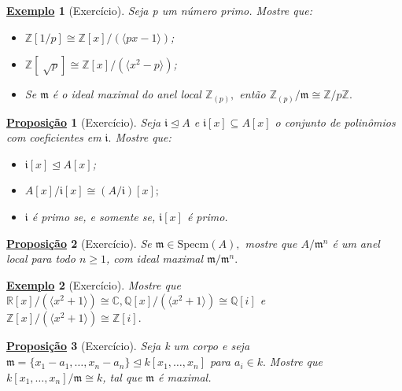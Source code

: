 \documentclass{article}
\newtheorem*{prop*}{\underline{Proposi\c c\~ao}}
\newtheorem{example}{\underline{Exemplo}}
\begin{document}
\begin{example}[Exercício]
  Seja p um número primo. Mostre que:
  \begin{itemize}
    \item[1)] \(\mathbb{Z}[1/p]\cong \mathbb{Z}[x]/(\langle px-1 \rangle)\);
    \item[2)] \(\mathbb{Z}[\sqrt[]{p}]\cong \mathbb{Z}[x]/(\langle x^{2}-p \rangle)\);
    \item[3)] Se \(\mathfrak{m}\) é o ideal maximal do anel local \(\mathbb{Z}_{(p)},\) então \(\mathbb{Z}_{(p)}/\mathfrak{m}\cong{\mathbb{Z}/p \mathbb{Z}}.\)
  \end{itemize}
\end{example}
\begin{prop*}[Exercício]
  Seja \(\mathfrak{i}\trianglelefteq{A}\) e \(\mathfrak{i}[x]\subseteq A[x]\) o conjunto de polinômios 
  com coeficientes em \(\mathfrak{i}.\) Mostre que:
  \begin{itemize}
    \item[1)] \(\mathfrak{i}[x] \trianglelefteq{A[x]}\);
    \item[2)] \(A[x]/\mathfrak{i}[x]\cong{(A/\mathfrak{i})}[x];\)
    \item[3)] \(\mathfrak{i}\) é primo se, e somente se, \(\mathfrak{i}[x]\) é primo.
  \end{itemize}
\end{prop*}
\begin{prop*}[Exercício]
  Se \(\mathfrak{m}\in \mathrm{Specm}(A),\) mostre que \(A/\mathfrak{m}^{n}\) é um anel local para todo
  \(n \geq 1\), com ideal maximal \(\mathfrak{m}/\mathfrak{m}^{n}.\)
\end{prop*}
\begin{example}[Exercício]
  Mostre que \(\mathbb{R}[x]/(\langle x^{2}+1 \rangle)\cong{\mathbb{C}}, \mathbb{Q}[x]/(\langle x^{2}+1 \rangle)\cong{\mathbb{Q}[i]}\)
  e \(\mathbb{Z}[x]/(\langle x^{2}+1 \rangle)\cong{\mathbb{Z}[i]}.\)
\end{example}
\begin{prop*}[Exercício]
  Seja k um corpo e seja \(\mathfrak{m} = \{x_{1}-a_{1}, \dotsc, x_{n}-a_{n}\}\trianglelefteq{k[x_{1}, \dotsc, x_{n}]}\) para
  \(a_{i}\in k.\) Mostre que \(k[x_{1}, \dotsc, x_{n}]/\mathfrak{m}\cong{k}\), tal que \(\mathfrak{m}\) é maximal. 
\end{prop*}
\end{document}
